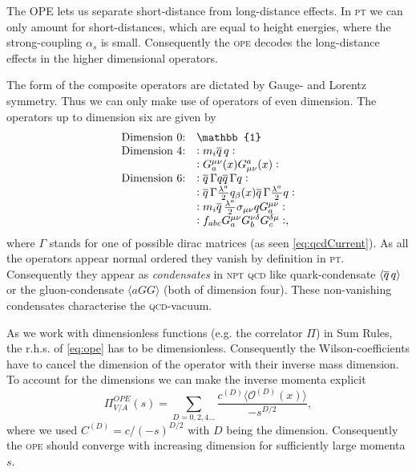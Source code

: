 \documentclass[../../index.tex]{subfiles}
\begin{document}
The OPE lets us separate short-distance from long-distance effects. In
\textsc{pt} we can only amount for short-distances, which are equal to height
energies, where the strong-coupling $\alpha_s$ is small. Consequently the \textsc{ope}
decodes the long-distance effects in the higher dimensional operators.

The form of the composite operators are dictated by Gauge- and Lorentz symmetry.
Thus we can only make use of operators of even dimension. The operators up to
dimension six are given by \cite{Pascual1984}
\begin{equation}
  \begin{array}{ll}
    \text{Dimension 0:} & \mathbb{1} \\
    \text{Dimension 4:} & :m_i \anti{q} q: \\
                        & :G_a^{\mu\nu}(x) G_{\mu\nu}^a(x): \\
    \text{Dimension 6:} & :\anti{q} \Gamma q \anti{q} \Gamma q: \\
                        & :\anti{q} \Gamma \frac{\lambda^a}{2} q_\beta(x) \anti{q} \Gamma \frac{\lambda^a}{2} q: \\
                        & :m_i \anti{q} \frac{\lambda^a}{2} \sigma_{\mu\nu} q G^{\mu\nu}_a: \\
                        & :f_{abc} G_a^{\mu\nu} G_b^{\nu\delta} G_c^{\delta\mu}:,
  \end{array}
\end{equation}
where $\Gamma$ stands for one of possible dirac matrices (as seen
\cref{eq:qcdCurrent}). As all the operators appear normal ordered they vanish by
definition in \textsc{pt}. Consequently they appear as \textit{condensates} in
\textsc{npt qcd} like quark-condensate $\langle \overline{q}\, q \rangle$ or
the gluon-condensate $\langle a GG \rangle$ (both of dimension four). These
non-vanishing condensates characterise the \textsc{qcd}-vacuum.

As we work with dimensionless functions (e.g. the correlator $\Pi$) in Sum Rules, the r.h.s. of
\cref{eq:ope} has to be dimensionless. Consequently the Wilson-coefficients have
to cancel the dimension of the operator with their inverse mass dimension. To
account for the dimensions we can make the inverse momenta explicit
\begin{equation}
  \Pi_{V/A}^{OPE}(s) = \sum_{D=0,2,4\dots} \frac{c^{(D)} \langle \mathcal{O}^{(D)}(x) \rangle}{-s^{D/2}},
\end{equation}
where we used $C^{(D)}=c/(-s)^{D/2}$ with $D$ being the dimension. Consequently
the \textsc{ope} should converge with increasing dimension for sufficiently large momenta
$s$.
\end{document}
